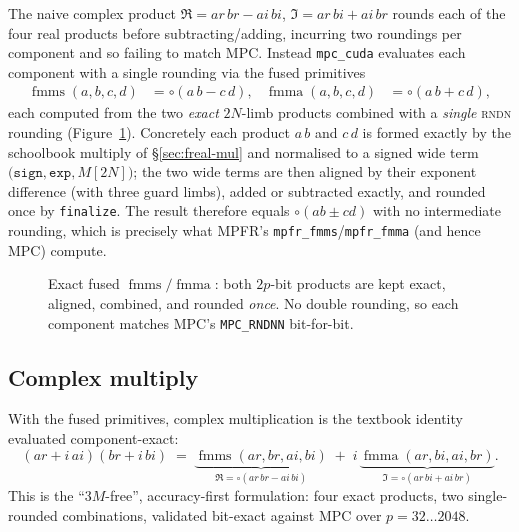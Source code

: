 \documentclass[11pt,a4paper]{article}
\newcommand{\code}[1]{\texttt{#1}}
\newcommand{\PB}{\ensuremath{p}}
\newcommand{\Nlimb}{\ensuremath{N}}
\newcommand{\round}{\ensuremath{\circ}}
\newcommand{\rndn}{\textsc{rndn}}
\newcommand{\fmma}{\ensuremath{\operatorname{fmma}}}
\newcommand{\fmms}{\ensuremath{\operatorname{fmms}}}
\begin{document}
The naive complex product $\Re = ar\,br - ai\,bi$, $\Im = ar\,bi + ai\,br$ rounds
each of the four real products before subtracting/adding, incurring two
roundings per component and so failing to match MPC. Instead \code{mpc\_cuda}
evaluates each component with a single rounding via the fused primitives
\begin{align}
\fmms(a,b,c,d) &= \round(a\,b - c\,d), &
\fmma(a,b,c,d) &= \round(a\,b + c\,d),
\end{align}
each computed from the two \emph{exact} $2\Nlimb$-limb products combined with a
\emph{single} \rndn{} rounding (Figure~\ref{fig:fmms}). Concretely each product
$a\,b$ and $c\,d$ is formed exactly by the schoolbook multiply of
\S\ref{sec:freal-mul} and normalised to a signed wide term
$\code{(sign},\code{exp},M[2\Nlimb])$; the two wide terms are then aligned by
their exponent difference (with three guard limbs), added or subtracted exactly,
and rounded once by \code{finalize}. The result therefore equals
$\round(ab\pm cd)$ with no intermediate rounding, which is precisely what MPFR's
\code{mpfr\_fmms}/\code{mpfr\_fmma} (and hence MPC) compute.

\begin{figure}[h]
\centering
{}
\caption{Exact fused $\fmms/\fmma$: both $2\PB$-bit products are kept exact,
aligned, combined, and rounded \emph{once}. No double rounding, so each component
matches MPC's \code{MPC\_RNDNN} bit-for-bit.}
\label{fig:fmms}
\end{figure}

\subsection{Complex multiply}
With the fused primitives, complex multiplication is the textbook identity
evaluated component-exact:
\begin{equation}
(ar+i\,ai)(br+i\,bi) \;=\; \underbrace{\fmms(ar,br,ai,bi)}_{\Re=\round(ar\,br-ai\,bi)}
\;+\; i\,\underbrace{\fmma(ar,bi,ai,br)}_{\Im=\round(ar\,bi+ai\,br)} .
\end{equation}
This is the ``$3M$-free'', accuracy-first formulation: four exact products, two
single-rounded combinations, validated bit-exact against MPC over $\PB=32\ldots
2048$.
\end{document}
